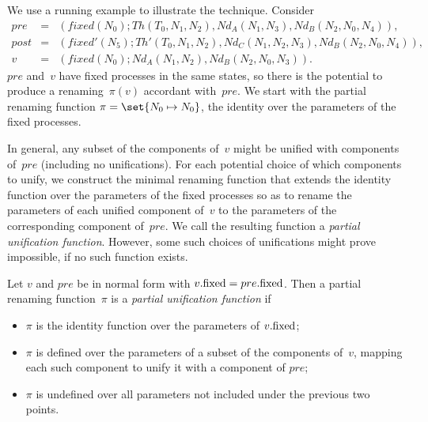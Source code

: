 
\begin{example}
We use a running example to illustrate the technique.  Consider
\begin{eqnarray*}
pre & = &
   (fixed(N_0); Th(T_0, N_1, N_2), Nd_A(N_1, N_3), Nd_B(N_2, N_0, N_4)), 
\\
post & = & 
  (fixed'(N_5); Th'(T_0, N_1, N_2), Nd_C(N_1, N_2, N_3), Nd_B(N_2, N_0, N_4)) ,
\\
v & = & 
  (fixed(N_0); Nd_A(N_1, N_2), Nd_B(N_2, N_0, N_3)).
\end{eqnarray*}
%
$pre$ and~$v$ have fixed processes in the same states, so there is the
potential to produce a renaming~$\pi(v)$ accordant with~$pre$.  We start with
the partial renaming function $\pi = \set{N_0 \mapsto N_0}$, the identity over
the parameters of the fixed processes.
\end{example}


In general, any subset of the components of~$v$ might be unified with
components of~$pre$ (including no unifications).  For each potential choice of
which components to unify, we construct the minimal renaming function that
extends the identity function over the parameters of the fixed processes so as
to rename the parameters of each unified component of~$v$ to the parameters of
the corresponding component of~$pre$.  We call the resulting function a
\emph{partial unification function}.  However, some such choices of
unifications might prove impossible, if no such function exists.
%
\begin{definition}
Let $v$ and $pre$ be in normal form with $v.\mathrm{fixed} = pre.\mathrm{fixed}$.  Then a
partial renaming function~$\pi$ is a \emph{partial unification function} if
\begin{itemize}
\item $\pi$ is the identity function over the parameters of $v.\mathrm{fixed}$;

\item $\pi$ is defined over the parameters of a subset of the components
  of~$v$, mapping each such component to unify it with a component of $pre$;

\item $\pi$ is undefined over all parameters not included under the previous
  two points.
\end{itemize}
\end{definition}


